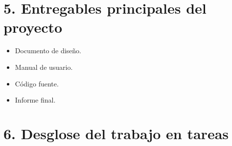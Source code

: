 \documentclass[11pt]{charter}
\begin{document}
\section{5. Entregables principales del proyecto}
\label{sec:entregables}

\begin{itemize}
\item Documento de diseño.
\item Manual de usuario.
\item Código fuente.
\item Informe final.
\end{itemize}

\section{6. Desglose del trabajo en tareas}
\label{sec:wbs}
\end{document}
